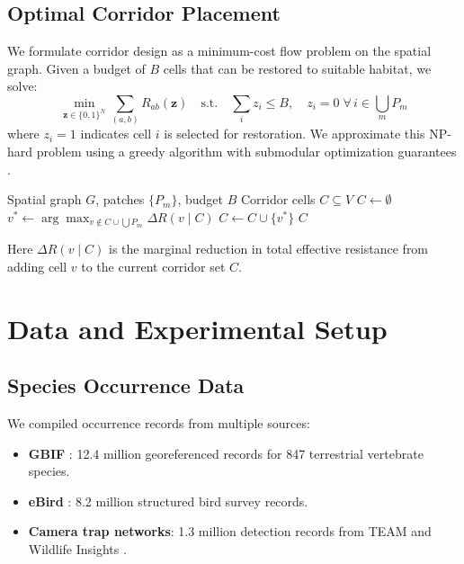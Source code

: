 \documentclass[11pt,a4paper]{article}
\begin{document}
\subsection{Optimal Corridor Placement}

We formulate corridor design as a minimum-cost flow problem on the
spatial graph. Given a budget of $B$ cells that can be restored to
suitable habitat, we solve:
\begin{equation}
  \min_{\mathbf{z} \in \{0,1\}^N} \sum_{(a,b)} R_{ab}(\mathbf{z})
  \quad \text{s.t.} \quad \sum_i z_i \leq B, \quad z_i = 0 \;
  \forall\, i \in \bigcup_m P_m
\end{equation}
where $z_i = 1$ indicates cell $i$ is selected for restoration. We
approximate this NP-hard problem using a greedy algorithm with
submodular optimization guarantees \citep{nemhauser1978analysis}.

\begin{algorithm}[H]
\caption{Greedy Corridor Placement}
\label{alg:corridor}
\begin{algorithmic}[1]
\REQUIRE Spatial graph $G$, patches $\{P_m\}$, budget $B$
\ENSURE Corridor cells $C \subseteq V$
\STATE $C \leftarrow \emptyset$
  \STATE $v^* \leftarrow \arg\max_{v \notin C \cup \bigcup P_m}
    \Delta R(v \mid C)$
  \STATE $C \leftarrow C \cup \{v^*\}$
\ENDFOR
\RETURN $C$
\end{algorithmic}
\end{algorithm}

Here $\Delta R(v \mid C)$ is the marginal reduction in total effective
resistance from adding cell $v$ to the current corridor set $C$.


\section{Data and Experimental Setup}
\label{sec:data}

\subsection{Species Occurrence Data}

We compiled occurrence records from multiple sources:

\begin{itemize}
  \item \textbf{GBIF} \citep{gbif2024}: 12.4 million georeferenced
    records for 847 terrestrial vertebrate species.
  \item \textbf{eBird} \citep{sullivan2009ebird}: 8.2 million
    structured bird survey records.
  \item \textbf{Camera trap networks}: 1.3 million detection records
    from TEAM \citep{jansen2014team} and Wildlife Insights
    \citep{ahumada2020wildlife}.
\end{itemize}
\end{document}
